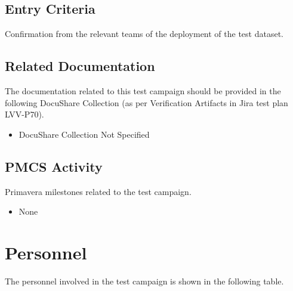 \documentclass[DM,lsstdraft,STR,toc]{lsstdoc}
\begin{document}
  \subsection{Entry Criteria}
  Confirmation from the relevant teams of the deployment of the test
dataset.



\subsection{Related Documentation}

The documentation related to this test campaign should be provided in the following DocuShare Collection
(as per Verification Artifacts in Jira test plan LVV-P70).

\begin{itemize}
\item DocuShare Collection Not Specified
\end{itemize}



\subsection{PMCS Activity}

Primavera milestones related to the test campaign.

\begin{itemize}
\item None
\end{itemize}


\newpage
\section{Personnel}
\label{sect:personnel}

The personnel involved in the test campaign is shown in the following table.
\end{document}
